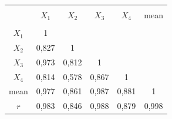 \begin{description}
\begin{table}[b]\small


\begin{center} %




\vspace*{2ex}





\tabcolsep=9.5pt


\begin{tabular}{|c|c|c|c|c|c|}


\hline


&&&&&\\[-9pt]


&$X_1$&$X_2$&$X_3$&$X_4$&mean\\


\hline


&&&&&\\[-9pt]


$X_1$&1&&&&\\


$X_2$&0,827&1&&&\\


$X_3$&0,973&0,812&1&&\\


$X_4$&0,814&0,578&0,867&1&\\


mean&0,977&0,861&0,987&0,881&1\\


$r$&0,983&0,846&0,988&0,879&0,998\\


\hline


\end{tabular}


\end{center}


\vspace*{-12pt}






\vspace*{12pt}


\begin{center}




\vspace*{2ex}






\end{center}
\end{table}
\end{description}
